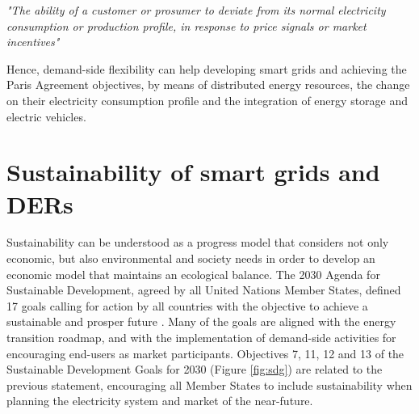 \begin{tcolorbox}
\textit{"The ability of a customer or prosumer to deviate from its normal electricity consumption or production profile, in response to price signals or market incentives"} 
\end{tcolorbox}

Hence, demand-side flexibility can help developing smart grids and achieving the Paris Agreement objectives, by means of distributed energy resources, the change on their electricity consumption profile and the integration of energy storage and electric vehicles. 
%


\section{Sustainability of smart grids and DERs}
Sustainability can be understood as a progress model that considers not only economic, but also environmental and society needs in order to develop an economic model that maintains an ecological balance. The 2030 Agenda for Sustainable Development, agreed by all United Nations Member States, defined 17 goals calling for action by all countries with the objective to achieve a sustainable and prosper future \cite{SDGOALS2015}. Many of the goals are aligned with the energy transition roadmap, and with the implementation of demand-side activities for encouraging end-users as market participants. Objectives 7, 11, 12 and 13 of the Sustainable Development Goals for 2030 (Figure \ref{fig:sdg}) are related to the previous statement, encouraging all Member States to include sustainability when planning the electricity system and market of the near-future.  

